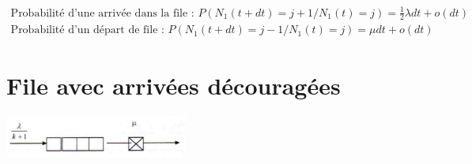 \documentclass[12pt, a4paper]{article}
\begin{document}
\begin{align*}
\text{Probabilit\'e d'une arriv\'ee dans la file : } P(N_{1}(t+dt)=j+1 / N_{1}(t)=j)=\frac{1}{2}\lambda dt + o(dt) \\
\text{Probabilit\'e d'un d\'epart de file : } P(N_{1}(t+dt)=j-1 / N_{1}(t)=j)=\mu dt + o(dt)
\end{align*}

\newpage

\section{File avec arriv\'ees d\'ecourag\'ees}
\begin{center}
\includegraphics[width=6cm]{exercice2}
\end{center}
\end{document}
